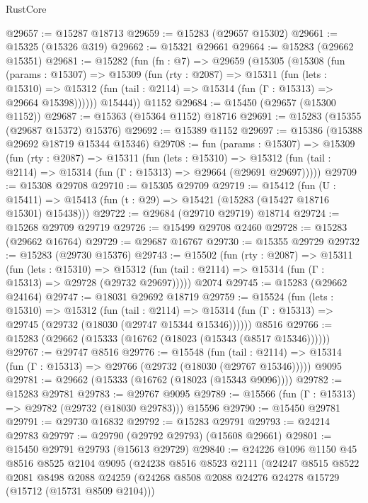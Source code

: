 \begin{lexlean}{RustCore}
\begin{coremodule}
@29657 := @15287 @18713
@29659 := @15283 (@29657 @15302)
@29661 := @15325 (@15326 @319)
@29662 := @15321 @29661
@29664 := @15283 (@29662 @15351)
@29681 := @15282
    (fun (fn : @7) =>
    @29659
      (@15305
        (@15308
          (fun (params : @15307) =>
          @15309
            (fun (rty : @2087) =>
            @15311
              (fun (lets : @15310) =>
              @15312 (fun (tail : @2114) => @15314 (fun (Γ : @15313) => @29664 @15398))))))
        @15444))
    @1152
@29684 := @15450 (@29657 (@15300 @1152))
@29687 := @15363 (@15364 @1152) @18716
@29691 := @15283 (@15355 (@29687 @15372) @15376)
@29692 := @15389 @1152
@29697 := @15386 (@15388 @29692 @18719 @15344 @15346)
@29708 := fun (params : @15307) =>
  @15309
    (fun (rty : @2087) =>
    @15311
      (fun (lets : @15310) =>
      @15312 (fun (tail : @2114) => @15314 (fun (Γ : @15313) => @29664 (@29691 @29697)))))
@29709 := @15308 @29708
@29710 := @15305 @29709
@29719 := @15412
    (fun (U : @15411) => @15413 (fun (t : @29) => @15421 (@15283 (@15427 @18716 @15301) @15438)))
@29722 := @29684 (@29710 @29719) @18714
@29724 := @15268 @29709 @29719
@29726 := @15499 @29708 @2460
@29728 := @15283 (@29662 @16764)
@29729 := @29687 @16767
@29730 := @15355 @29729
@29732 := @15283 (@29730 @15376)
@29743 := @15502
    (fun (rty : @2087) =>
    @15311
      (fun (lets : @15310) =>
      @15312 (fun (tail : @2114) => @15314 (fun (Γ : @15313) => @29728 (@29732 @29697)))))
    @2074
@29745 := @15283 (@29662 @24164)
@29747 := @18031 @29692 @18719
@29759 := @15524
    (fun (lets : @15310) =>
    @15312
      (fun (tail : @2114) =>
      @15314 (fun (Γ : @15313) => @29745 (@29732 (@18030 (@29747 @15344 @15346))))))
    @8516
@29766 := @15283 (@29662 (@15333 (@16762 (@18023 (@15343 (@8517 @15346))))))
@29767 := @29747 @8516
@29776 := @15548
    (fun (tail : @2114) => @15314 (fun (Γ : @15313) => @29766 (@29732 (@18030 (@29767 @15346)))))
    @9095
@29781 := @29662 (@15333 (@16762 (@18023 (@15343 @9096))))
@29782 := @15283 @29781
@29783 := @29767 @9095
@29789 := @15566 (fun (Γ : @15313) => @29782 (@29732 (@18030 @29783))) @15596
@29790 := @15450 @29781
@29791 := @29730 @16832
@29792 := @15283 @29791
@29793 := @24214 @29783
@29797 := @29790 (@29792 @29793) (@15608 @29661)
@29801 := @15450 @29791 @29793 (@15613 @29729)
@29840 := @24226
    @1096
    @1150
    @45
    @8516
    @8525
    @2104
    @9095
    (@24238
      @8516
      @8523
      @2111
      (@24247
        @8515
        @8522
        @2081
        @8498
        @2088
        @24259
        (@24268 @8508 @2088 @24276 @24278 @15729 (@15712 (@15731 @8509 @2104)))

\end{coremodule}
\end{lexlean}
